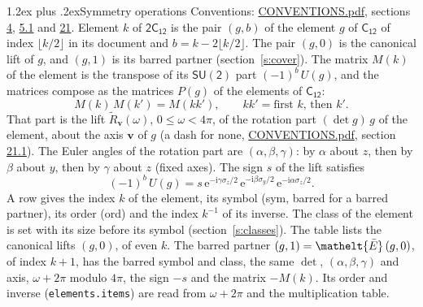 \documentclass[10pt,a4paper]{article}
\makeatletter
\renewcommand\section{\@startsection{section}{1}{\z@}{-3ex plus -1ex minus -.2ex}%
  {1.2ex plus .2ex}{\normalfont\large\sffamily\bfseries\color{parttitle}}}
\numberwithin{equation}{section}
\newcommand{\eltfont}[1]{{\let\sigma\eltsigma\mathelt{#1}}}
\newcommand{\grp}[1]{\mathsf{#1}}
\newcommand{\elt}[1]{\eltfont{#1}}
\newcommand{\vv}{\mathbf{v}}
\newcommand{\iunit}{\mathrm{i}}
\newcommand{\expe}{\mathrm{e}}
\newcommand{\barred}[1]{\bar{#1}}
\newcommand{\lift}[1]{\tilde{#1}}
\newcommand{\pauli}[1]{\sigma_{#1}}
\makeatother
\begin{document}
\section{Symmetry operations}\label{s:elements}
Conventions: \href{../../CONVENTIONS.pdf}{CONVENTIONS.pdf}, sections \href{../../../rotation/CONVENTIONS.pdf\#conv.4}{4}, \href{../../../rotation/CONVENTIONS.pdf\#conv.5.1}{5.1} and \href{../../CONVENTIONS.pdf\#conv.21}{21}.
\leavevmode\label{n:index.element}\label{n:element.g}Element $k$ of $\grp{2C_{12}}$ is the pair $(g, b)$ of the element $g$ of \href{../../../rotation/data/pdf/C12.pdf}{$\grp{C_{12}}$} of index $\lfloor k/2\rfloor$ in its document and $b = k - 2\lfloor k/2\rfloor$. The pair $(g, 0)$ is the canonical lift of $g$, and $(g, 1)$ is its barred partner (section~\ref{s:cover}). \label{n:matrix.element.pin}\label{n:matrix.element}The matrix $M(k)$ of the element is the transpose of its $\grp{SU(2)}$ part $(-1)^{b}\,U(g)$, and the matrices compose as the matrices $P(g)$ of the elements of $\grp{C_{12}}$:
\begin{equation}\label{e:mprod}M(k)\,M(k') = M(kk'),\qquad kk' = \text{first } k\text{, then } k'.\end{equation}
\leavevmode\label{n:angle.omega}\label{n:vector.axis}\label{n:vector.pole}That part is the lift $\lift{R}_{\vv}(\omega)$, $0 \le \omega < 4\pi$, of the rotation part $(\det g)\,g$ of the element, about the axis $\vv$ of $g$ (a dash for none, \href{../../CONVENTIONS.pdf}{CONVENTIONS.pdf}, section \href{../../CONVENTIONS.pdf\#conv.21.1}{21.1}). \label{n:angle.euler.alpha}\label{n:angle.euler.beta}\label{n:angle.euler.gamma}\label{n:vector.coordinates}The Euler angles of the rotation part are $(\alpha,\beta,\gamma)$: by $\alpha$ about $z$, then by $\beta$ about $y$, then by $\gamma$ about $z$ (fixed axes). \label{n:local.euler.sign}The sign $s$ of the lift satisfies
\begin{equation}\label{e:euler}(-1)^{b}\,U(g) = s\,\expe^{-\iunit\gamma\pauli{z}/2}\,\expe^{-\iunit\beta\pauli{y}/2}\,\expe^{-\iunit\alpha\pauli{z}/2}.\end{equation}
\leavevmode\label{n:index.element.inverse}\label{n:head.sym}\label{n:head.ord}A row gives the index $k$ of the element, its symbol (sym, barred for a barred partner), its order (ord) and the index $k^{-1}$ of its inverse. \label{n:head.class}The class of the element is set with its size before its symbol (section~\ref{s:classes}).
The table lists the canonical lifts $(g, 0)$, of even $k$. The barred partner $(g, 1) = \elt{\barred{E}}\,(g, 0)$, of index $k + 1$, has the barred symbol and class, the same $\det$, $(\alpha,\beta,\gamma)$ and axis, $\omega + 2\pi$ modulo $4\pi$, the sign $-s$ and the matrix $-M(k)$. Its order and inverse (\texttt{elements.items}) are read from $\omega + 2\pi$ and the multiplication table.
\end{document}

